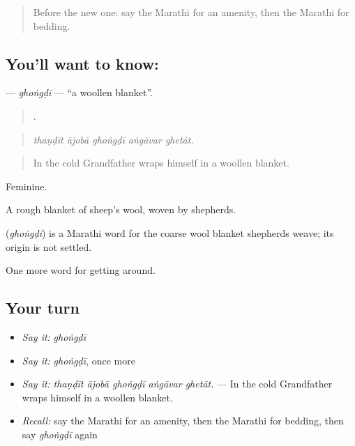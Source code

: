 \label{lesson:MR-C415-ghongdi}



\begin{quote}
Before the new one: say the Marathi for an amenity, then the Marathi for bedding.
\end{quote}

\subsection*{You'll want to know: }
\textbf{} — \emph{ghoṅgḍī} — \textquotedblleft{}a woollen blanket\textquotedblright{}.

\begin{quote}
    .
\end{quote}

\begin{quote}
\emph{thaṇḍīt ājobā ghoṅgḍī aṅgāvar ghetāt.}
\end{quote}

\begin{quote}
In the cold Grandfather wraps himself in a woollen blanket.
\end{quote}

Feminine.

A rough blanket of sheep’s wool, woven by shepherds.

\begin{cousinweb}
\textbf{} (\emph{ghoṅgḍī}) is a Marathi word for the coarse wool blanket shepherds weave; its origin is not settled.
\end{cousinweb}

\begin{grammarlens}[title={What you've built}]
One more word for getting around.
\end{grammarlens}

\subsection*{Your turn}
\begin{itemize}
\raggedright
  \item \emph{Say it:} \emph{ghoṅgḍī}
  \item \emph{Say it:} \emph{ghoṅgḍī}, once more
  \item \emph{Say it:} \emph{thaṇḍīt ājobā ghoṅgḍī aṅgāvar ghetāt.} — In the cold Grandfather wraps himself in a woollen blanket.
  \item \emph{Recall:} say the Marathi for an amenity, then the Marathi for bedding, then say \emph{ghoṅgḍī} again
\end{itemize}


